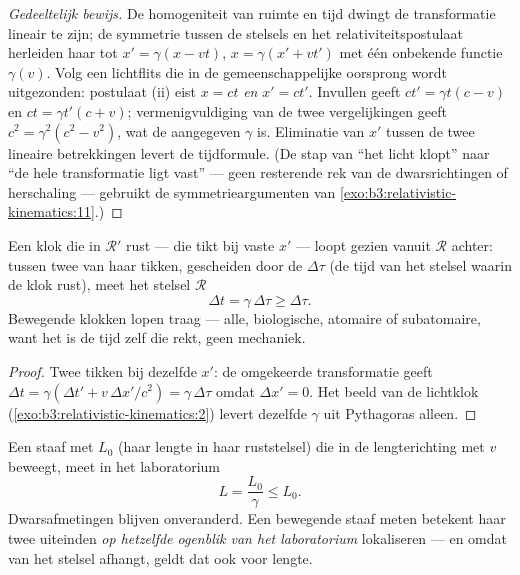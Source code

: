 \begin{proof}[Gedeeltelijk bewijs]
De homogeniteit van ruimte en tijd dwingt de transformatie lineair te
zijn; de symmetrie tussen de stelsels en het relativiteitspostulaat
herleiden haar tot $x' = \gamma(x - vt)$, $x = \gamma(x' + vt')$ met één
onbekende functie $\gamma(v)$. Volg een lichtflits die in de
gemeenschappelijke oorsprong wordt uitgezonden: postulaat (ii) eist $x = ct$ \emph{en} $x' = ct'$. Invullen geeft $ct' = \gamma t(c - v)$ en $ct = \gamma t'(c + v)$; vermenigvuldiging van de twee vergelijkingen geeft
$c^2 = \gamma^2(c^2 - v^2)$, wat de aangegeven $\gamma$ is. Eliminatie
van $x'$ tussen de twee lineaire betrekkingen levert de tijdformule. (De
stap van ``het licht klopt'' naar ``de hele transformatie ligt vast'' ---
geen resterende rek van de dwarsrichtingen of herschaling --- gebruikt de
symmetrieargumenten van \cref{exo:b3:relativistic-kinematics:11}.)
\end{proof}

\begin{proposition}[Tijdrek]\label{prop:b3:relativistic-kinematics:dilation}
Een klok die in $\mathcal R'$ rust --- die tikt bij vaste $x'$ --- loopt
gezien vanuit $\mathcal R$ achter: tussen twee van haar tikken, gescheiden
door de \emph{} $\Delta\tau$ (de tijd van het stelsel waarin de
klok rust), meet het stelsel $\mathcal R$
\[
\Delta t = \gamma\,\Delta\tau \ge \Delta\tau .
\]
Bewegende klokken lopen traag --- alle, biologische, atomaire of
subatomaire, want het is de tijd zelf die rekt, geen mechaniek.
\end{proposition}

\begin{proof}
Twee tikken bij dezelfde $x'$: de omgekeerde transformatie geeft $\Delta t
= \gamma(\Delta t' + v\,\Delta x'/c^2) = \gamma\,\Delta\tau$ omdat
$\Delta x' = 0$. Het beeld van de lichtklok
(\cref{exo:b3:relativistic-kinematics:2}) levert dezelfde $\gamma$ uit
Pythagoras alleen.
\end{proof}

\begin{proposition}[Lengtekrimp]\label{prop:b3:relativistic-kinematics:contraction}
Een staaf met \emph{} $L_0$ (haar lengte in haar ruststelsel)
die in de lengterichting met $v$ beweegt, meet in het laboratorium
\[
L = \frac{L_0}{\gamma} \le L_0 .
\]
Dwarsafmetingen blijven onveranderd. Een bewegende staaf meten betekent
haar twee uiteinden \emph{op hetzelfde ogenblik van het laboratorium}
lokaliseren --- en omdat  van het stelsel afhangt, geldt
dat ook voor lengte.
\end{proposition}

